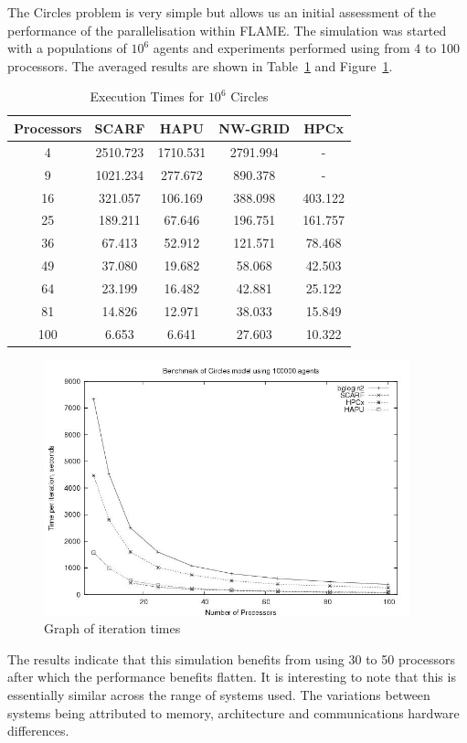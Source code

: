 The Circles problem is very simple but allows us an initial assessment of the performance of the parallelisation within FLAME. The simulation was started with a populations of $10^6$  agents and experiments performed using from 4 to 100 processors. The averaged results are shown in Table~\ref{tab:ExecutionTimesForCircles} and Figure~\ref{fig:Circles-graph}.
{
\renewcommand{\arraystretch}{1.25}
\begin{table}[ht]
	\centering
		\begin{tabular}{c|cccc}
	Processors	&SCARF		&HAPU			&NW-GRID	&HPCx	\\ \hline
	4						&2510.723	&1710.531	&2791.994	&-		\\
	9						&1021.234	&277.672	&890.378	&-		\\
	16					&321.057	&106.169	&388.098	&403.122 \\
	25					&189.211	&67.646		&196.751	&161.757 \\	
	36					&67.413		&52.912		&121.571	&78.468 \\
	49					&37.080		&19.682		&58.068		&42.503	\\
	64					&23.199		&16.482		&42.881		&25.122	\\
	81					&14.826		&12.971		&38.033		&15.849	\\
	100					&6.653		&6.641		&27.603		&10.322
	\end{tabular}
	\caption{Execution Times for $10^6$ Circles}
	\label{tab:ExecutionTimesForCircles}
\end{table}
}
\begin{figure}[ht]
	\centering
		\includegraphics[width=300pt]{Circles-graph.jpg}
	\caption{Graph of iteration times}
	\label{fig:Circles-graph}
\end{figure}

The results indicate that this simulation benefits from using 30 to 50 processors after which the performance benefits flatten. It is interesting to note that this is essentially similar across the range of systems used. The variations between systems being attributed to memory, architecture and communications hardware differences.

